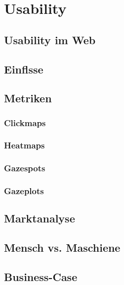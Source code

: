 
\chapter{Usability}
	\section{Usability im Web}
	\section{Einflsse}
	\section{Metriken}
		\subsection{Clickmaps}
		\subsection{Heatmaps}
		\subsection{Gazespots}
		\subsection{Gazeplots}
	\section{Marktanalyse}
	\section{Mensch vs. Maschiene}
	\section{Business-Case}

